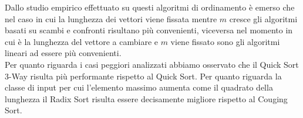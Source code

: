 \documentclass[a4paper, 12pt, oneside]{book}
\begin{document}
\noindent
Dallo studio empirico effettuato su questi algoritmi di ordinamento è emerso che nel caso in cui la lunghezza dei vettori viene fissata mentre $m$ cresce gli algoritmi basati su scambi e confronti risultano più convenienti, viceversa nel momento in cui è la lunghezza del vettore a cambiare e $m$ viene fissato sono gli algoritmi lineari ad essere più convenienti.
\\


\noindent
Per quanto riguarda i casi peggiori analizzati abbiamo osservato che il Quick Sort 3-Way risulta più performante rispetto al Quick Sort.
Per quanto riguarda la classe di input per cui l'elemento massimo aumenta come il quadrato della lunghezza il Radix Sort risulta essere decisamente migliore rispetto al Couging Sort.

\end{document}
